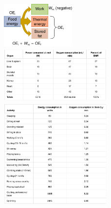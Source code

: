 \documentclass{article}
\begin{document}
\begin{figure}
\centering
\includegraphics[width=0.33\textwidth]{figures/work1.jpeg} \\ \vspace{1cm}
\includegraphics[width=0.5\textwidth]{figures/work2.png} \\ \vspace{1cm}
\includegraphics[width=0.5\textwidth]{figures/work3.png}\\ \vspace{1cm}
\end{figure}
\end{document}
